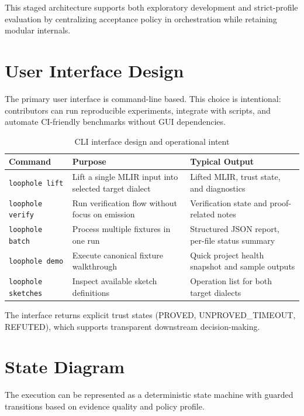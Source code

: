 This staged architecture supports both exploratory development and strict-profile evaluation by centralizing acceptance policy in orchestration while retaining modular internals.

\section{User Interface Design}
The primary user interface is command-line based. This choice is intentional: contributors can run reproducible experiments, integrate with scripts, and automate CI-friendly benchmarks without GUI dependencies.

\begin{table}[H]
\centering
\caption{CLI interface design and operational intent}
\begin{tabular}{|p{2.8cm}|p{4.8cm}|p{7.6cm}|}
\hline
\textbf{Command} & \textbf{Purpose} & \textbf{Typical Output} \\
\hline
\texttt{loophole lift} & Lift a single MLIR input into selected target dialect & Lifted MLIR, trust state, and diagnostics \\
\hline
\texttt{loophole verify} & Run verification flow without focus on emission & Verification state and proof-related notes \\
\hline
\texttt{loophole batch} & Process multiple fixtures in one run & Structured JSON report, per-file status summary \\
\hline
\texttt{loophole demo} & Execute canonical fixture walkthrough & Quick project health snapshot and sample outputs \\
\hline
\texttt{loophole sketches} & Inspect available sketch definitions & Operation list for both target dialects \\
\hline
\end{tabular}
\end{table}

The interface returns explicit trust states (PROVED, UNPROVED\_TIMEOUT, REFUTED), which supports transparent downstream decision-making.

\section{State Diagram}
The execution can be represented as a deterministic state machine with guarded transitions based on evidence quality and policy profile.


